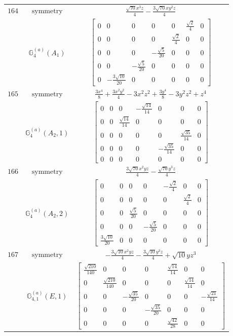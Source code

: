 \documentclass[fleqn,8pt,landscape]{jsarticle}
\begin{document}
\begin{longtable}{ccc}
$ 164 $ & $ \text{symmetry} $ & $ \frac{\sqrt{70} x^{3} z}{4} - \frac{3 \sqrt{70} x y^{2} z}{4} $ \\
$  $ & $ \mathbb{G}_{4}^{(a)}(A_{1}) $ & $ \begin{bmatrix} 0 & 0 & 0 & 0 & 0 & \frac{\sqrt{2}}{4} & 0 \\ 0 & 0 & 0 & 0 & \frac{\sqrt{2}}{4} & 0 & 0 \\ 0 & 0 & 0 & - \frac{\sqrt{5}}{20} & 0 & 0 & 0 \\ 0 & 0 & - \frac{\sqrt{5}}{20} & 0 & 0 & 0 & 0 \\ 0 & - \frac{3 \sqrt{10}}{20} & 0 & 0 & 0 & 0 & 0 \end{bmatrix} $ \\ \hline
$ 165 $ & $ \text{symmetry} $ & $ \frac{3 x^{4}}{8} + \frac{3 x^{2} y^{2}}{4} - 3 x^{2} z^{2} + \frac{3 y^{4}}{8} - 3 y^{2} z^{2} + z^{4} $ \\
$  $ & $ \mathbb{G}_{4}^{(a)}(A_{2},1) $ & $ \begin{bmatrix} 0 & 0 & 0 & - \frac{\sqrt{14}}{14} & 0 & 0 & 0 \\ 0 & 0 & \frac{\sqrt{14}}{14} & 0 & 0 & 0 & 0 \\ 0 & 0 & 0 & 0 & 0 & \frac{\sqrt{35}}{14} & 0 \\ 0 & 0 & 0 & 0 & - \frac{\sqrt{35}}{14} & 0 & 0 \\ 0 & 0 & 0 & 0 & 0 & 0 & 0 \end{bmatrix} $ \\ \hline
$ 166 $ & $ \text{symmetry} $ & $ \frac{3 \sqrt{70} x^{2} y z}{4} - \frac{\sqrt{70} y^{3} z}{4} $ \\
$  $ & $ \mathbb{G}_{4}^{(a)}(A_{2},2) $ & $ \begin{bmatrix} 0 & 0 & 0 & 0 & - \frac{\sqrt{2}}{4} & 0 & 0 \\ 0 & 0 & 0 & 0 & 0 & \frac{\sqrt{2}}{4} & 0 \\ 0 & 0 & \frac{\sqrt{5}}{20} & 0 & 0 & 0 & 0 \\ 0 & 0 & 0 & - \frac{\sqrt{5}}{20} & 0 & 0 & 0 \\ \frac{3 \sqrt{10}}{20} & 0 & 0 & 0 & 0 & 0 & 0 \end{bmatrix} $ \\ \hline
$ 167 $ & $ \text{symmetry} $ & $ - \frac{3 \sqrt{10} x^{2} y z}{4} - \frac{3 \sqrt{10} y^{3} z}{4} + \sqrt{10} y z^{3} $ \\
$  $ & $ \mathbb{G}_{4,1}^{(a)}(E,1) $ & $ \begin{bmatrix} \frac{\sqrt{210}}{140} & 0 & 0 & 0 & \frac{\sqrt{14}}{14} & 0 & 0 \\ 0 & \frac{\sqrt{210}}{140} & 0 & 0 & 0 & \frac{\sqrt{14}}{14} & 0 \\ 0 & 0 & - \frac{\sqrt{35}}{20} & 0 & 0 & 0 & - \frac{\sqrt{21}}{14} \\ 0 & 0 & 0 & - \frac{\sqrt{35}}{20} & 0 & 0 & 0 \\ 0 & 0 & 0 & 0 & \frac{\sqrt{42}}{28} & 0 & 0 \end{bmatrix} $ \\ \hline

\end{longtable}
\end{document}
